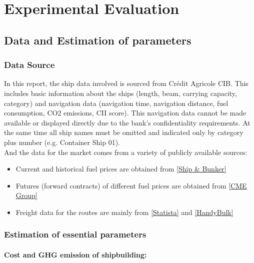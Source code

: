 \documentclass[a4paper,12pt]{article}
\begin{document}
\section{Experimental Evaluation}

\subsection{Data and Estimation of parameters}

\subsubsection{Data Source}
In this report, the ship data involved is sourced from Crédit Agricole CIB. This includes basic information about the ships (length, beam, carrying capacity, category) and navigation data (navigation time, navigation distance, fuel consumption, CO2 emissions, CII score).
This navigation data cannot be made available or displayed directly due to the bank's confidentiality requirements.
At the same time all ship names must be omitted and indicated only by category plus number (e.g. Container Ship 01).\\


And the data for the market comes from a variety of publicly available sources:
\begin{itemize}
	\item Current and historical fuel prices are obtained from \href{https://shipandbunker.com/prices}{[Ship \& Bunker]}
	\item Futures (forward contracts) of different fuel prices are obtained from \href{https://www.cmegroup.com/markets/energy/refined-products/mini-european-fob-rdam-marine-fuel-05-barges-platts.html}{[CME Group]}
	\item Freight data for the routes are mainly from \href{https://www.statista.com/statistics/1313360/container-freight-index-shanghai-rotterdam}{[Statista]} and \href{https://www.handybulk.com/ship-charter-rates/}{[HandyBulk]}
\end{itemize}

\subsubsection{Estimation of essential parameters}

\paragraph{Cost and GHG emission of shipbuilding:}
\end{document}
